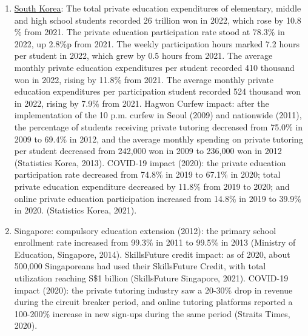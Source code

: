 \documentclass[12pt,a4paper,onecolumn]{article}
\numberwithin{equation}{section}
\begin{document}
\begin{enumerate}
    \item \hyperlink{https://kostat.go.kr/board.es?mid=a20111020000&bid=11758&act=view&list_no=424684}{South Korea}: The total private education expenditures of elementary, middle and high school students recorded 26 trillion won in 2022, which rose by 10.8$\%$ from 2021. The private education participation rate stood at 78.3$\%$ in 2022, up 2.8$\%$p from 2021. The weekly participation hours marked 7.2 hours per student in 2022, which grew by 0.5 hours from 2021. The average monthly private education expenditures per student recorded 410 thousand won in 2022, rising by 11.8$\%$ from 2021. The average monthly private education expenditures per participation student recorded 524 thousand won in 2022, rising by 7.9$\%$ from 2021.
    Hagwon Curfew impact: after the implementation of the 10 p.m. curfew in Seoul (2009) and nationwide (2011), the percentage of students receiving private tutoring decreased from 75.0$\%$ in 2009 to 69.4$\%$ in 2012, and the average monthly spending on private tutoring per student decreased from 242,000 won in 2009 to 236,000 won in 2012 (Statistics Korea, 2013). COVID-19 impact (2020): the private education participation rate decreased from 74.8$\%$ in 2019 to 67.1$\%$ in 2020; total private education expenditure decreased by 11.8$\%$ from 2019 to 2020; and online private education participation increased from 14.8$\%$ in 2019 to 39.9$\%$ in 2020. (Statistics Korea, 2021).
    \item Singapore: compulsory education extension (2012): the primary school enrollment rate increased from 99.3$\%$ in 2011 to 99.5$\%$ in 2013 (Ministry of Education, Singapore, 2014). SkillsFuture credit impact: as of 2020, about 500,000 Singaporeans had used their SkillsFuture Credit, with total utilization reaching S\$1 billion (SkillsFuture Singapore, 2021). COVID-19 impact (2020): the private tutoring industry saw a 20-30$\%$ drop in revenue during the circuit breaker period, and online tutoring platforms reported a 100-200$\%$ increase in new sign-ups during the same period (Straits Times, 2020).
\end{enumerate}
\end{document}
